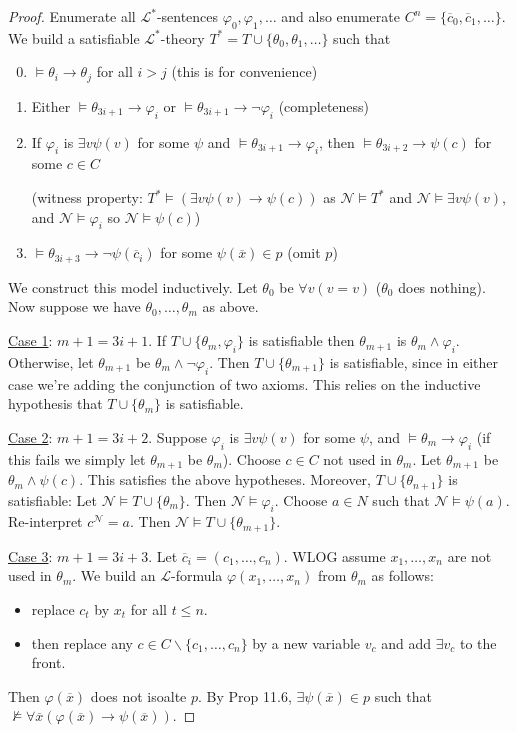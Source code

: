 \documentclass[]{article}
\theoremstyle{custhm}
\theoremstyle{cusdef}
\theoremstyle{custhm}
\theoremstyle{custhm}
\theoremstyle{custhm}
\theoremstyle{ex}
\theoremstyle{custhm}
\theoremstyle{cusdef}
\theoremstyle{remark}
\theoremstyle{remark}
\newcommand{\ra}{\rightarrow}
\renewcommand{\L}{\mathcal{L}}
\renewcommand{\phi}{\varphi}
\renewcommand{\bar}{\overline}
\newcommand{\N}{\mathcal{N}}
\begin{document}
\begin{proof}
Enumerate all $\L^\ast$-sentences $\phi_0,\phi_1,\dots$ and also enumerate $C^n = \{\bar{c}_0,\bar{c}_1,\dots\}$. We build a satisfiable $\L^\ast$-theory $T^\ast = T\cup\{\theta_0,\theta_1,\dots\}$ such that
\begin{enumerate}[label=\arabic*)]
	\setcounter{enumi}{-1}
\item $\models \theta_i\ra\theta_j$ for all $i > j$ (this is for convenience)
\item Either $\models \theta_{3i+1}\ra\phi_i$ or $\models \theta_{3i+1}\ra\neg\phi_i$ (completeness)
\item If $\phi_i$ is $\exists v\psi(v)$ for some $\psi$ and $\models \theta_{3i+1}\ra\phi_i$, then $\models \theta_{3i+2}\ra\psi(c)$ for some $c\in C$

(witness property: $T^\ast \models (\exists v\psi(v)\ra\psi(c))$ as $\N\models T^\ast$ and $\N\models \exists v\psi(v)$, and $\N\models \phi_i$ so $\N\models \psi(c)$)

\item $\models \theta_{3i+3}\ra\neg\psi(\bar{c}_i)$ for some $\psi(\bar{x})\in p$ (omit $p$)
\end{enumerate}

We construct this model inductively. Let $\theta_0$ be $\forall v(v=v)$ ($\theta_0$ does nothing). Now suppose we have $\theta_0,\dots,\theta_m$ as above.

\underline{Case 1}: $m+1 = 3i+1$. If $T\cup\{\theta_m,\phi_i\}$ is satisfiable then $\theta_{m+1}$ is $\theta_m\land\phi_i$. Otherwise, let $\theta_{m+1}$ be $\theta_m\land \neg\phi_i$. Then $T\cup\{\theta_{m+1}\}$ is satisfiable, since in either case we're adding the conjunction of two axioms. This relies on the inductive hypothesis that $T\cup\{\theta_m\}$ is satisfiable.

\underline{Case 2}: $m+1 = 3i+2$. Suppose $\phi_i$ is $\exists v\psi(v)$ for some $\psi$, and $\models \theta_m\ra \phi_i$ (if this fails we simply let $\theta_{m+1}$ be $\theta_m$). Choose $c\in C$ not used in $\theta_m$. Let $\theta_{m+1}$ be $\theta_m\land\psi(c)$. This satisfies the above hypotheses. Moreover, $T\cup\{\theta_{n+1}\}$ is satisfiable: Let $\N\models T\cup\{\theta_m\}$. Then $\N\models \phi_i$. Choose $a\in N$ such that $\N\models \psi(a)$. Re-interpret $c^\N = a$. Then $\N\models T\cup\{\theta_{m+1}\}$.

\underline{Case 3}: $m+1 = 3i+3$. Let $\bar{c}_i = (c_1,\dots,c_n)$. WLOG assume $x_1,\dots,x_n$ are not used in $\theta_m$. We build an $\L$-formula $\phi(x_1,\dots,x_n)$ from $\theta_m$ as follows:
\begin{itemize}
	\item replace $c_t$ by $x_t$ for all $t \le n$.
	\item then replace any $c\in C\backslash\{c_1,\dots,c_n\}$ by a new variable $v_c$ and add $\exists v_c$ to the front.
\end{itemize}
Then $\phi(\bar{x})$ does not isoalte $p$. By Prop 11.6, $\exists \psi(\bar{x})\in p$ such that $\not\models \forall\bar{x}(\phi(\bar{x})\ra\psi(\bar{x}))$.


\end{proof}
\end{document}
